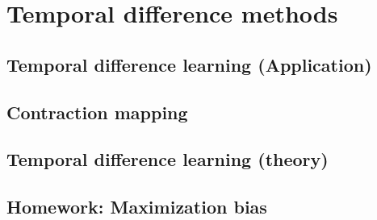 \documentclass{article}
\begin{document}
\section{Temporal difference methods}
\subsection{Temporal difference learning (Application)}
\subsubsection{}
\subsubsection{}
\subsubsection{}

\subsection{Contraction mapping}
\subsubsection{}
\subsubsection{}

\subsection{Temporal difference learning (theory)}
\subsubsection{}
\subsubsection{}
\subsubsection{}

\subsection{Homework: Maximization bias}
\subsubsection{}
\subsubsection{}
\subsubsection{}
\subsubsection{}
\end{document}
